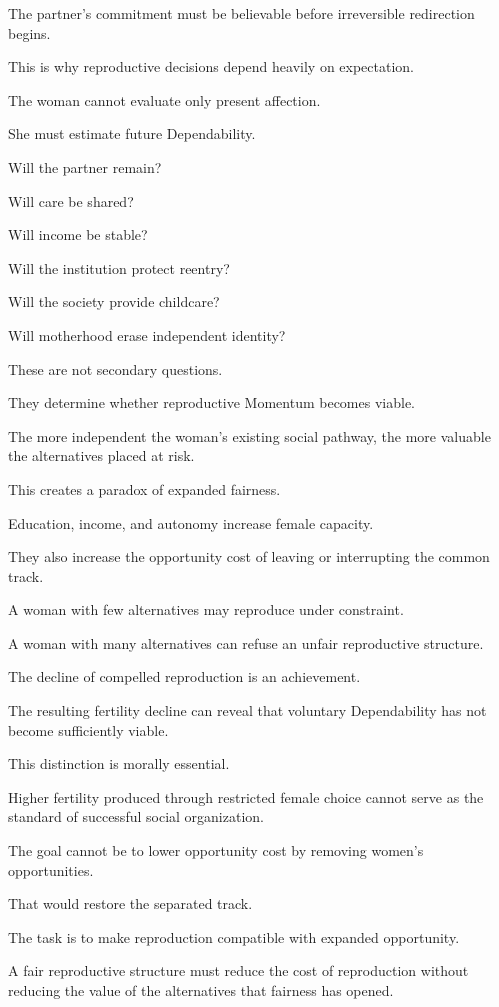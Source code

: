 The partner’s commitment must be believable before irreversible redirection begins.

This is why reproductive decisions depend heavily on expectation.

The woman cannot evaluate only present affection.

She must estimate future Dependability.

Will the partner remain?

Will care be shared?

Will income be stable?

Will the institution protect reentry?

Will the society provide childcare?

Will motherhood erase independent identity?

These are not secondary questions.

They determine whether reproductive Momentum becomes viable.

The more independent the woman’s existing social pathway, the more valuable the alternatives placed at risk.

This creates a paradox of expanded fairness.

Education, income, and autonomy increase female capacity.

They also increase the opportunity cost of leaving or interrupting the common track.

A woman with few alternatives may reproduce under constraint.

A woman with many alternatives can refuse an unfair reproductive structure.

The decline of compelled reproduction is an achievement.

The resulting fertility decline can reveal that voluntary Dependability has not become sufficiently viable.

This distinction is morally essential.

Higher fertility produced through restricted female choice cannot serve as the standard of successful social organization.

The goal cannot be to lower opportunity cost by removing women’s opportunities.

That would restore the separated track.

The task is to make reproduction compatible with expanded opportunity.

A fair reproductive structure must reduce the cost of reproduction without reducing the value of the alternatives that fairness has opened.

